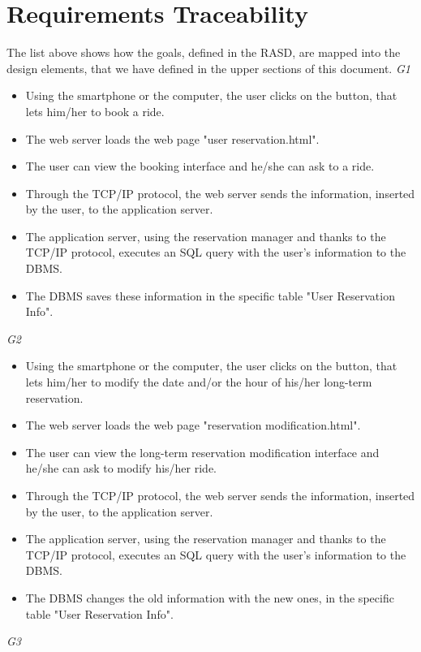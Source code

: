 \section{Requirements Traceability}
The list above shows how the goals, defined in the RASD, are mapped into the design elements, that we have defined in the upper sections of this document.
\newline
\newline
	\emph{G1}
		\begin{itemize}
			\item Using the smartphone or the computer, the user clicks on the button, that lets him/her to book a ride.
			\item The web server loads the web page "user reservation.html".
			\item The user can view the booking interface and he/she can ask to a ride.
			\item Through the TCP/IP protocol, the web server sends the information, inserted by the user, to the application server.
			\item The application server, using the reservation manager and thanks to the TCP/IP protocol, executes an SQL query with the user's information to the DBMS.
			\item The DBMS saves these information in the specific table "User Reservation Info".
		\end{itemize}
	\emph{G2}
		\begin{itemize}
			\item Using the smartphone or the computer, the user clicks on the button, that lets him/her to modify the date and/or the hour of his/her long-term reservation.
			\item The web server loads the web page "reservation modification.html".
			\item The user can view the long-term reservation modification interface and he/she can ask to modify his/her ride.
			\item Through the TCP/IP protocol, the web server sends the information, inserted by the user, to the application server.
			\item The application server, using the reservation manager and thanks to the TCP/IP protocol, executes an SQL query with the user's information to the DBMS.
			\item The DBMS changes the old information with the new ones, in the specific table "User Reservation Info".
		\end{itemize}
	\emph{G3}
